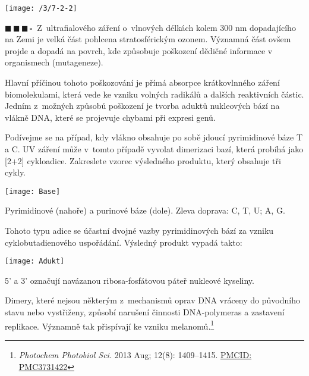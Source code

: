 \documentclass{book}
\newcommand{\tri}{$\blacksquare \, \blacksquare \, \blacksquare \, \square \; \; $}
\renewenvironment{quotation}{\par}{\par} %
\begin{document}
\begin{center}
\texttt{[image: /3/7-2-2]}
\end{center}

\newpage %
\begin{quotation}
\tri Z~ultrafialového záření o~vlnových délkách kolem 300 nm dopadajícího
na Zemi je velká část pohlcena stratosférickým ozonem. Významná část
ovšem projde a dopadá na povrch, kde způsobuje poškození dědičné informace
v organismech (mutageneze). 

Hlavní příčinou tohoto poškozování je přímá absorpce krátkovlnného
záření biomolekulami, která vede ke vzniku volných radikálů a dalších
reaktivních částic. Jedním z~možných způsobů poškození je tvorba aduktů
nukleových bází na vlákně DNA, které se projevuje chybami při expresi
genů. 

Podívejme se na případ, kdy vlákno obsahuje po sobě jdoucí pyrimidinové
báze T a C. UV záření může v~tomto případě vyvolat dimerizaci bazí, která probíhá jako {[}2+2{]}
cykloadice. Zakreslete vzorec výsledného produktu, který obsahuje tři cykly.
\begin{center}
\texttt{[image: Base]}
\par\end{center}
Pyrimidinové (nahoře) a purinové báze (dole). Zleva doprava: C, T, U; A, G.
\end{quotation} \dotfill \par 
Tohoto typu adice se účastní dvojné vazby pyrimidinových bází za vzniku
cyklobutadienového uspořádání. Výsledný produkt vypadá takto:

\begin{center}
\texttt{[image: Adukt]}
\end{center}

5' a 3' označují navázanou ribosa-fosfátovou páteř nukleové kyseliny.

Dimery, které nejsou některým z~mechanismů oprav DNA vráceny do původního
stavu nebo vystřiženy, způsobí narušení činnosti DNA-polymeras a zastavení
replikace. Významně tak přispívají ke vzniku melanomů.\footnote{\textit{Photochem Photobiol Sci.} 2013 Aug; 12(8): 1409--1415. \href{https://www.ncbi.nlm.nih.gov/pmc/articles/PMC3731422/}{PMCID: \underline{PMC3731422}}}
\end{document}
